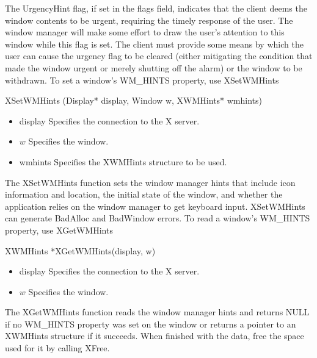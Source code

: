 \documentclass{report}
\begin{document}
\begin{itemize}
\begin{itemize}
            \bigbreak \noindent 
            The UrgencyHint flag, if set in the flags field, indicates that the client deems the window contents to be urgent, requiring the timely response of the user. The window manager will make some effort to draw the user’s attention to this window while this flag is set. The client must provide some means by which the user can cause the urgency flag to be cleared (either mitigating the condition that made the window urgent or merely shutting off the alarm) or the window to be withdrawn.
            \bigbreak \noindent 
            To set a window’s WM\_HINTS property, use XSetWMHints
            \bigbreak \noindent 
            \begin{cppcode}
            XSetWMHints (Display* display, Window w, XWMHints* wmhints)
            \end{cppcode}
            \bigbreak \noindent
            \begin{itemize}
                \item display Specifies the connection to the X server.
                \item $w$ Specifies the window.
                \item wmhints Specifies the XWMHints structure to be used.
            \end{itemize}
            The XSetWMHints function sets the window manager hints that include icon information and location, the initial state of the window, and whether the application relies on the window manager to get keyboard input.
            \bigbreak \noindent 
            XSetWMHints can generate BadAlloc and BadWindow errors. 
            \bigbreak \noindent 
            To read a window’s WM\_HINTS property, use XGetWMHints
            \bigbreak \noindent 
            \begin{cppcode}
                XWMHints *XGetWMHints(display, w)
            \end{cppcode}
            \bigbreak \noindent
            \begin{itemize}
                \item display Specifies the connection to the X server.
                \item $w$ Specifies the window.
            \end{itemize}
            The XGetWMHints function reads the window manager hints and returns NULL if no WM\_HINTS property was set on the window or returns a pointer to an XWMHints structure if it succeeds. When finished with the data, free the space used for it by calling XFree.

\end{itemize}
\end{itemize}
\end{document}
